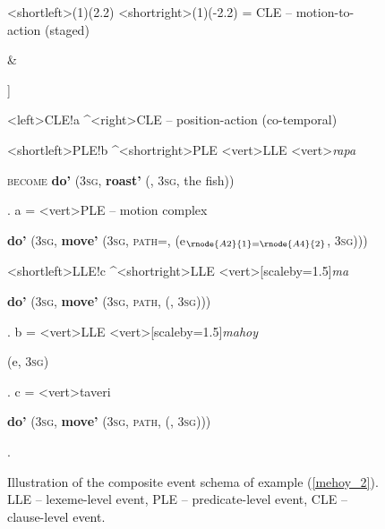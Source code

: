\begin{sidewaysfigure}


\jtree[xunit=12em,yunit=2em]
<shortleft>(1)(2.2)
<shortright>(1)(-2.2)
\! = {CLE -- motion-to-action (staged)}
{\begin{scriptsize} [[ \textbf{do'} (3\textsc{sg}, \textbf{move'} (3\textsc{sg}, \textsc{path=come}, \textbf{return'} (e$_{1=2}$, 3\textsc{sg}))) ] \& \end{scriptsize}}
{\begin{scriptsize} ]\end{scriptsize}}
<left>{CLE}!a ^<right>{CLE -- position-action (co-temporal)}{\begin{scriptsize} \end{scriptsize}}
<shortleft>{PLE}!b ^<shortright>{PLE}
<vert>{LLE}
<vert>{\textit{rapa}}{\begin{scriptsize} \textsc{become} \textbf{do'} (3\textsc{sg}, \textbf{roast'} (, 3\textsc{sg}, the fish))\end{scriptsize}}.
\!a = <vert>{PLE -- motion complex}{\begin{scriptsize} \textbf{do'} (3\textsc{sg}, \textbf{move'} (3\textsc{sg}, \textsc{path=}, \textbf{} (e$_{\rnode{A2}{1}=\rnode{A4}{2}}$, 3\textsc{sg}))) \end{scriptsize}}
<shortleft>{LLE}!c ^<shortright>{LLE}
<vert>[scaleby=1.5]{\textit{ma}}
{\begin{scriptsize} \textbf{do'} (3\textsc{sg}, \textbf{move'} (3\textsc{sg}, \textsc{path}, \textbf{} (, 3\textsc{sg})))\end{scriptsize}}.
\!b = <vert>{LLE}
<vert>[scaleby=1.5]{\textit{mahoy}}
{\begin{scriptsize} \textbf{} (e, 3\textsc{sg})\end{scriptsize}}.
\!c = <vert>{taveri}
{\begin{scriptsize} \textbf{do'} (3\textsc{sg}, \textbf{move'} (3\textsc{sg}, \textsc{path}, \textbf{} (, 3\textsc{sg}))) \end{scriptsize}}.
\endjtree


\caption[Event schema illustration of example (\ref{mehoy_2})]{Illustration of the composite event schema of example (\ref{mehoy_2}). LLE -- lexeme-level event, PLE -- predicate-level event, CLE -- clause-level event.}
\label{figure:eventschema_mehoy_2}
\end{sidewaysfigure}


